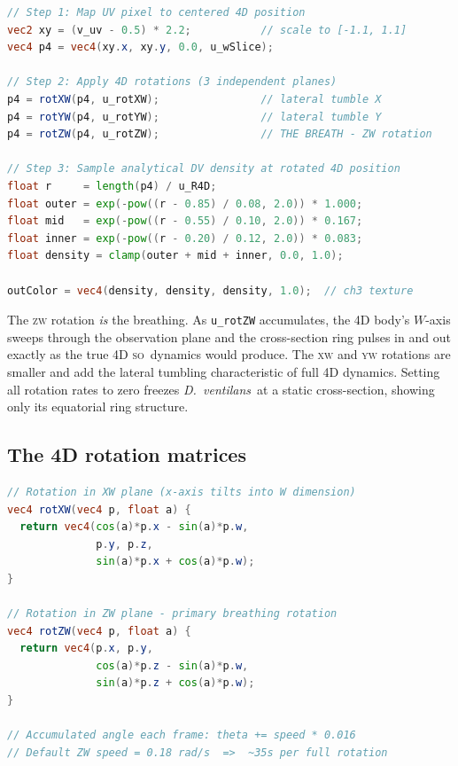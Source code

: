 \documentclass[11pt,a4paper]{article}
\newcommand{\spc}[1]{\textit{#1}}  %
\newcommand{\DV}{\spc{D.\ ventilans}}
\newcommand{\SO}{\textsc{so}}
\begin{document}
\begin{lstlisting}[language=glsl, caption={\textsc{hyper\_frag} --- WebGL2 fragment shader, runs per pixel per frame.}]
// Step 1: Map UV pixel to centered 4D position
vec2 xy = (v_uv - 0.5) * 2.2;           // scale to [-1.1, 1.1]
vec4 p4 = vec4(xy.x, xy.y, 0.0, u_wSlice);

// Step 2: Apply 4D rotations (3 independent planes)
p4 = rotXW(p4, u_rotXW);                // lateral tumble X
p4 = rotYW(p4, u_rotYW);                // lateral tumble Y
p4 = rotZW(p4, u_rotZW);                // THE BREATH - ZW rotation

// Step 3: Sample analytical DV density at rotated 4D position
float r     = length(p4) / u_R4D;
float outer = exp(-pow((r - 0.85) / 0.08, 2.0)) * 1.000;
float mid   = exp(-pow((r - 0.55) / 0.10, 2.0)) * 0.167;
float inner = exp(-pow((r - 0.20) / 0.12, 2.0)) * 0.083;
float density = clamp(outer + mid + inner, 0.0, 1.0);

outColor = vec4(density, density, density, 1.0);  // ch3 texture
\end{lstlisting}

The \textsc{zw} rotation \emph{is} the breathing. As \texttt{u\_rotZW}
accumulates, the 4D body's $W$-axis sweeps through the observation plane
and the cross-section ring pulses in and out exactly as the true 4D \SO\
dynamics would produce. The \textsc{xw} and \textsc{yw} rotations are
smaller and add the lateral tumbling characteristic of full 4D dynamics.
Setting all rotation rates to zero freezes \DV\ at a static cross-section,
showing only its equatorial ring structure.

\subsection{The 4D rotation matrices}

\begin{lstlisting}[language=glsl, caption={4D rotation matrices in \textsc{glsl}. The \textsc{zw} plane carries the breath; \textsc{xw}/\textsc{yw} add asymmetric tumble.}]
// Rotation in XW plane (x-axis tilts into W dimension)
vec4 rotXW(vec4 p, float a) {
  return vec4(cos(a)*p.x - sin(a)*p.w,
              p.y, p.z,
              sin(a)*p.x + cos(a)*p.w);
}

// Rotation in ZW plane - primary breathing rotation
vec4 rotZW(vec4 p, float a) {
  return vec4(p.x, p.y,
              cos(a)*p.z - sin(a)*p.w,
              sin(a)*p.z + cos(a)*p.w);
}

// Accumulated angle each frame: theta += speed * 0.016
// Default ZW speed = 0.18 rad/s  =>  ~35s per full rotation
\end{lstlisting}
\end{document}
